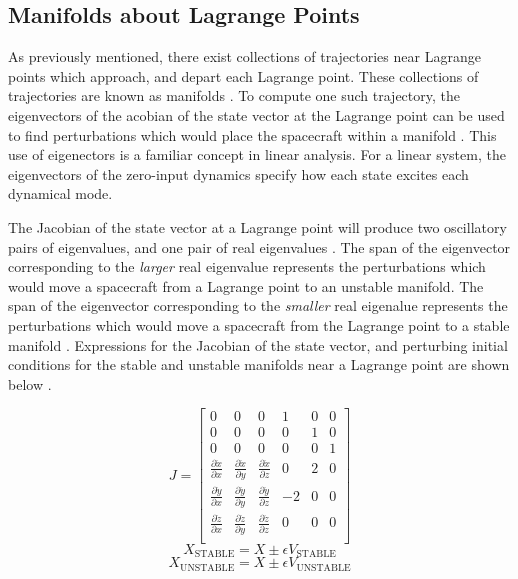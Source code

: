 \documentclass[conf]{new-aiaa}
\begin{document}
\begin{multicols}{2}
\subsection{Manifolds about Lagrange Points}

As previously mentioned, there exist collections of trajectories near Lagrange points 
which approach, and depart each Lagrange point. These collections of trajectories are 
known as manifolds \cite{rund2018interplanetary}. To compute one such trajectory, the 
eigenvectors of the acobian of the state vector at the Lagrange point can be used to 
find perturbations which would place the spacecraft within a manifold 
\cite{rund2018interplanetary}. This use of eigenectors 
is a familiar concept in linear analysis. For a linear system, the eigenvectors
of the zero-input dynamics specify how each state excites each dynamical mode.

The Jacobian of the 
state vector at a Lagrange point will produce two oscillatory pairs of eigenvalues, 
and one pair of real eigenvalues \cite{rund2018interplanetary}. 
The span of the eigenvector corresponding to the 
\textit{larger} real eigenvalue 
represents the perturbations which would move a spacecraft from a Lagrange point to 
an unstable manifold. The span of the eigenvector corresponding to the \textit{smaller} real 
eigenalue represents the perturbations which would move a spacecraft from the Lagrange point
to a stable manifold \cite{rund2018interplanetary}. 
Expressions for the Jacobian of the state vector, and 
perturbing initial conditions for the stable and unstable manifolds near a Lagrange
point are shown below \cite{rund2018interplanetary}.

\begin{equation}
    J = \begin{bmatrix}
        0 & 0 & 0 & 1 & 0 & 0 \\
        0 & 0 & 0 & 0 & 1 & 0 \\
        0 & 0 & 0 & 0 & 0 & 1 \\
        \frac{\partial \ddot{x}}{\partial x} & 
        \frac{\partial \ddot{x}}{\partial y} & 
        \frac{\partial \ddot{x}}{\partial z} & 0 & 2 & 0 \\
        \frac{\partial \ddot{y}}{\partial x} & 
        \frac{\partial \ddot{y}}{\partial y} & 
        \frac{\partial \ddot{y}}{\partial z} & -2 & 0 & 0 \\
        \frac{\partial \ddot{z}}{\partial x} & 
        \frac{\partial \ddot{z}}{\partial y} & 
        \frac{\partial \ddot{z}}{\partial z} & 0 & 0 & 0 \\
    \end{bmatrix}
\end{equation}
\begin{equation}
    X_{\text{STABLE}} = X \pm \epsilon V_{\text{STABLE}}
\end{equation}
\begin{equation}
    X_{\text{UNSTABLE}} = X \pm \epsilon V_{\text{UNSTABLE}}
\end{equation}


\end{multicols}
\end{document}
